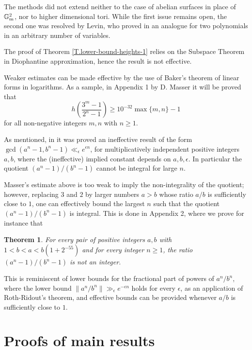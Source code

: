 \documentclass[leqno,12pt]{article} %
\def\G{{{\mathbb G}}}
\theoremstyle{plain} %
\newtheorem{theorem}{\indent\sc Theorem}[section]
\theoremstyle{definition} %
\begin{document}
The methods did not extend neither to the case of abelian surfaces in place of $\G_{\rm m}^2$, nor to higher dimensional tori.  While the first issue remains open, the second one was resolved by Levin, who proved in \cite{L} an analogue for two polynomials in an arbitrary number of variables. 


\smallskip

The proof of Theorem \ref{T.lower-bound-heights-1} relies on the Subspace Theorem in Diophantine approximation, hence the result  is not effective.

Weaker estimates can be made effective by the use of Baker's theorem of linear forms in logarithms. As a sample, in  Appendix 1 by D. Masser it will be proved that
$$
h\left(\frac{3^m-1}{2^n-1}\right)\geq 10^{-32}\max\{m,n\} -1
$$
for all non-negative integers $m,n$ with $n\geq 1$.

\smallskip

As mentioned,  in \cite{BCZ} it was proved an ineffective result of the form $\gcd(a^n-1, b^n-1)\ll_\epsilon e^{\epsilon n}$, for multiplicatively independent positive integers $a,b$, where the (ineffective) implied constant depends on $a,b,\epsilon$. In particular the quotient $(a^n-1)/(b^n-1)$ cannot be integral for large $n$. 

Masser's estimate above is too weak to imply the non-integrality  of the quotient; however, replacing $3$ and $2$ by larger numbers $a>b$ whose ratio $a/b$ is sufficiently close to $1$, one can effectively bound the largest $n$ such that the quotient $(a^n-1)/(b^n-1)$ is integral.
This is done in Appendix 2, where we prove for instance that

\smallskip

\begin{theorem}\label{T.appendix}
For every pair of positive integers $a,b$ with $1<b<a<b(1+2^{-55})$ and for every integer $n\geq 1$, the ratio $(a^n-1)/(b^n-1)$ is not an integer. 
\end{theorem} 
\smallskip

This  is reminiscent of lower bounds for the fractional part of powers of $a^n/b^n$, where the lower bound $\|a^n/b^n\|\gg_\epsilon e^{-\epsilon n}$ holds for every $\epsilon$, as an application of Roth-Ridout's theorem,  and effective bounds can be provided whenever $a/b$ is sufficiently close to $1$.

 

\section{Proofs of main results}
\end{document}
